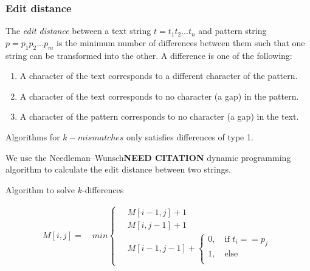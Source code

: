 \subsubsection{Edit distance}

The \emph{edit distance} between a text string $t = t_1 t_2 ... t_n$ and pattern string $p = p_1 p_2  ... p_m$ is the minimum number of differences between them such that one string can be transformed into the other.
A difference is one of the following:

\begin{enumerate}

  \item A character of the text corresponds to a different character of the pattern.
  \item A character of the text corresponds to no character (a gap) in the pattern.
  \item A character of the pattern corresponds to no character (a gap) in the text.

\end{enumerate}

Algorithms for $k-mismatches$ only satisfies differences of type 1.

We use the Needleman–Wunsch{\bf NEED CITATION} dynamic programming algorithm to calculate the edit distance between two strings.


 Algorithm to solve $k$-differences 

\begin{equation}
\begin{aligned}
M[i, j] = \quad min
\begin{cases}
\quad M[i - 1, j] + 1 \\
\quad M[i, j-1] + 1 \\
\quad M[i-1, j-1] + \begin{cases} 
0, \quad \text{if }t_i == p_j \\
1, \quad \text{else } \\
\end{cases}
\end{cases}
\end{aligned}
\end{equation}



